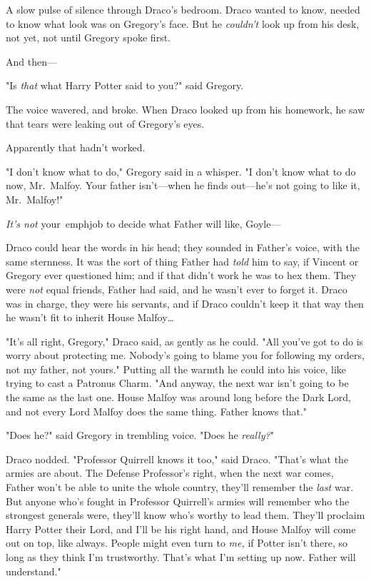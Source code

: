 A slow pulse of silence through Draco's bedroom. Draco wanted to know, needed 
to know what look was on Gregory's face. But he \emph{couldn't} look up from 
his desk, not yet, not until Gregory spoke first.

And then---

"Is \emph{that} what Harry Potter said to you?" said Gregory.

The voice wavered, and broke. When Draco looked up from his homework, he saw 
that tears were leaking out of Gregory's eyes.

Apparently that hadn't worked.

"I don't know what to do," Gregory said in a whisper. "I don't know what to do 
now, Mr.~Malfoy. Your father isn't---when he finds out---he's not going to like 
it, Mr.~Malfoy!"

\emph{It's not} your\ emph{job to decide what Father will like, Goyle---}

Draco could hear the words in his head; they sounded in Father's voice, with 
the same sternness. It was the sort of thing Father had \emph{told} him to say, 
if Vincent or Gregory ever questioned him; and if that didn't work he was to 
hex them. They were \emph{not} equal friends, Father had said, and he wasn't 
ever to forget it. Draco was in charge, they were his servants, and if Draco 
couldn't keep it that way then he wasn't fit to inherit House Malfoy{\ldots}

"It's all right, Gregory," Draco said, as gently as he could. "All you've got 
to do is worry about protecting me. Nobody's going to blame you for following 
my orders, not my father, not yours." Putting all the warmth he could into his 
voice, like trying to cast a Patronus Charm. "And anyway, the next war isn't 
going to be the same as the last one. House Malfoy was around long before the 
Dark Lord, and not every Lord Malfoy does the same thing. Father knows that."

"Does he?" said Gregory in trembling voice. "Does he \emph{really?}"

Draco nodded. "Professor Quirrell knows it too," said Draco. "That's what the 
armies are about. The Defense Professor's right, when the next war comes, 
Father won't be able to unite the whole country, they'll remember the 
\emph{last} war. But anyone who's fought in Professor Quirrell's armies will 
remember who the strongest generals were, they'll know who's worthy to lead 
them. They'll proclaim Harry Potter their Lord, and I'll be his right hand, and 
House Malfoy will come out on top, like always. People might even turn to 
\emph{me,} if Potter isn't there, so long as they think I'm trustworthy. That's 
what I'm setting up now. Father will understand."

